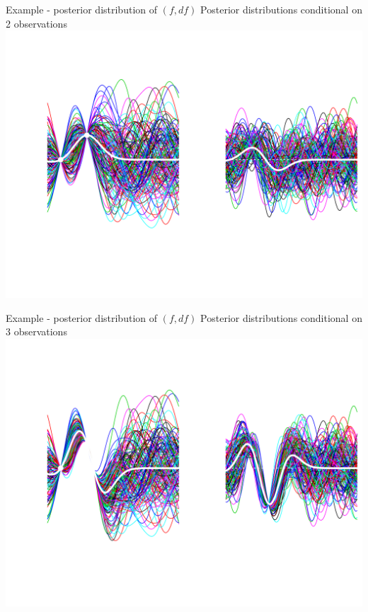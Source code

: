 \documentclass[ignorenonframetext,xcolor=pdflatex,table,dvipsnames,serif]{beamer}
\begin{document}
\begin{frame}{Example - posterior distribution of $(f, df)$}
  Posterior distributions conditional on 2 observations
  \center\includegraphics[scale=0.5]{postAni03}
\end{frame}

\begin{frame}{Example - posterior distribution of $(f, df)$}
  Posterior distributions conditional on 3 observations
  \center\includegraphics[scale=0.5]{postAni04}
\end{frame}
\end{document}
